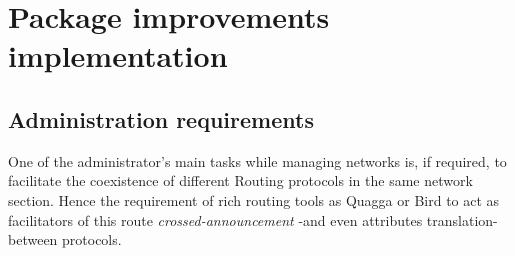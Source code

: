 \chapter{Package improvements implementation}
\label{ch:implementation}
\pagestyle{headings}

\section{Administration requirements}
One of the administrator's main tasks while managing networks is, if required, to facilitate the coexistence of different Routing protocols in the same network section. Hence the requirement of rich routing tools as Quagga or Bird to act as facilitators of this route \textit{crossed-announcement} -and even attributes translation- between protocols.

